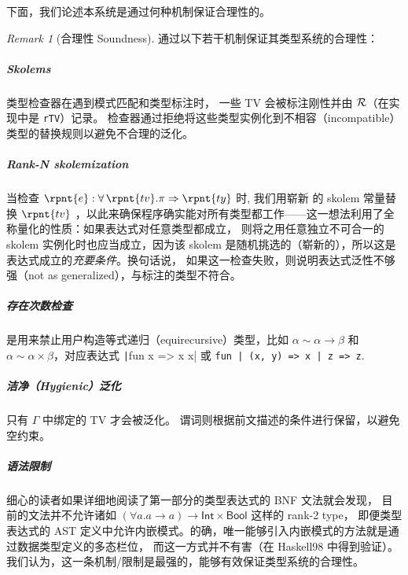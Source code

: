 \documentclass[a4paper, 11pt]{article}
\theoremstyle{remark}\newtheorem*{remark}{Remark}
\theoremstyle{definition}\newtheorem*{definition}{Definition}
\begin{document}
下面，我们论述本系统是通过何种机制保证合理性的。

\begin{remark}[合理性 Soundness]
  \Tigris 通过以下若干机制保证其类型系统的合理性：
  \subparagraph*{Skolems} 类型检查器在遇到模式匹配和类型标注时，
  一些 TV 会被标注刚性并由 $\mathcal{R}$（在实现中是 \texttt{rTV}）记录。
  检查器通过拒绝将这些类型实例化到不相容（incompatible）类型的替换规则以避免不合理的泛化。
  \subparagraph*{Rank-N skolemization} 当检查 \(\rpnt{e} : \forall \, \rpnt{tv} . \pi \Rightarrow \rpnt{ty}\) 时, 我们用崭新
  的 skolem 常量替换 \(\rpnt{tv}\) ，以此来确保程序确实能对所有类型都工作——这一想法利用了全称量化的性质：如果表达式对任意类型都成立，
  则将之用任意独立不可合一的 skolem 实例化时也应当成立，因为该 skolem 是随机挑选的（崭新的），所以这是表达式成立的\emph{充要条件}。换句话说，
  如果这一检查失败，则说明表达式泛性不够强（not as generalized），与标注的类型不符合。
  \subparagraph*{存在次数检查} 是用来禁止用户构造等式递归（equirecursive）类型，比如
  \(\alpha \sim \alpha\to \beta\) 和 \(\alpha \sim \alpha\times\beta\)，对应表达式
  \texttt|fun x => x x| 或
  \texttt{fun | (x, y) => x | z => z}.
  \subparagraph*{洁净（Hygienic）泛化} 只有 $\Gamma$ 中绑定的 TV 才会被泛化。
  谓词则根据前文描述的条件进行保留，以避免空约束。
  \subparagraph*{语法限制} 细心的读者如果详细地阅读了第一部分的类型表达式的 BNF 文法就会发现，
  目前的文法并不允许诸如 \((\forall a. a\to a)\to\mathsf{Int}\times \mathsf{Bool}\) 这样的 rank-2 type，
  即便类型表达式的 AST 定义中允许内嵌模式。的确，唯一能够引入内嵌模式的方法就是通过数据类型定义的多态栏位，
  而这一方式并不有害（在 Haskell98 中得到验证）。我们认为，这一条机制/限制是最强的，能够有效保证类型系统的合理性。
\end{remark}
\end{document}
